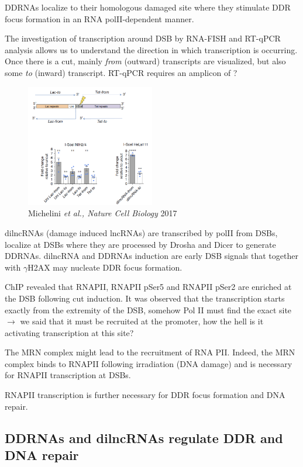 DDRNAs localize to their homologous damaged site where they stimulate DDR focus formation in an RNA polII-dependent manner.

The investigation of transcription around DSB by RNA-FISH and RT-qPCR analysis allows us to understand the direction in which transcription is occurring. Once there is a cut, mainly \emph{from} (outward) transcripts are visualized, but also some \emph{to} (inward) transcript. RT-qPCR requires an amplicon of ?

\begin{figure}
\centering
\includegraphics[width=0.5\textwidth]{Screen_Shot_2022-12-07_at_09-23-19.png}
\caption{Michelini \emph{et al., Nature Cell Biology} 2017}
\end{figure}


dilncRNAs (damage induced lncRNAs) are transcribed by polII from DSBs, localize at DSBs where they are processed by Drosha and Dicer to generate DDRNAs. dilncRNA and DDRNAs induction are early DSB signals that together with \(\gamma\)H2AX may nucleate DDR focus formation.

ChIP revealed that RNAPII, RNAPII pSer5 and RNAPII pSer2 are enriched at the DSB following cut induction. It was observed that the transcription starts exactly from the extremity of the DSB, somehow Pol II must find the exact site $\rightarrow$ we said that it must be recruited at the promoter, how the hell is it activating transcription at this site?

The MRN complex might lead to the recruitment of RNA PII. Indeed, the MRN complex binds to RNAPII following irradiation (DNA damage) and is necessary for RNAPII transcription at DSBs.

RNAPII transcription is further necessary for DDR focus formation and DNA repair.

\hypertarget{ddrnas-and-dilncrnas-regulate-ddr-and-dna-repair}{%
\subsection{DDRNAs and dilncRNAs regulate DDR and DNA repair}\label{ddrnas-and-dilncrnas-regulate-ddr-and-dna-repair}}

